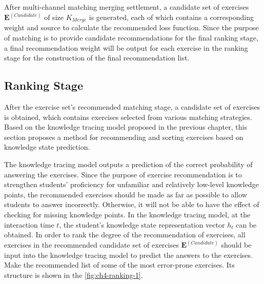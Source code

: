 
After multi-channel matching merging settlement, a candidate set of exercises \(\mathbf{E}^{(Candidate)}\) of size \(K_{Merge}\) is generated, each of which contains a corresponding weight and source to calculate the recommended loss function. Since the purpose of matching is to provide candidate recommendations for the final ranking stage, a final recommendation weight will be output for each exercise in the ranking stage for the construction of the final recommendation list.

\subsection{Ranking Stage}


After the exercise set's recommended matching stage, a candidate set of exercises is obtained, which contains exercises selected from various matching strategies. Based on the knowledge tracing model proposed in the previous chapter, this section proposes a method for recommending and sorting exercises based on knowledge state prediction.

The knowledge tracing model outputs a prediction of the correct probability of answering the exercises. Since the purpose of exercise recommendation is to strengthen students' proficiency for unfamiliar and relatively low-level knowledge points, the recommended exercises should be made as far as possible to allow students to answer incorrectly. Otherwise, it will not be able to have the effect of checking for missing knowledge points. In the knowledge tracing model, at the interaction time \(t\), the student's knowledge state representation vector \(h_t\) can be obtained. In order to rank the degree of the recommendation of exercises, all exercises in the recommended candidate set of exercises \(\mathbf{E}^{(Candidate)}\) should be input into the knowledge tracing model to predict the answers to the exercises. Make the recommended list of some of the most error-prone exercises. Its structure is shown in the \figurename{\ref{fig:ch4-ranking-1}}.

